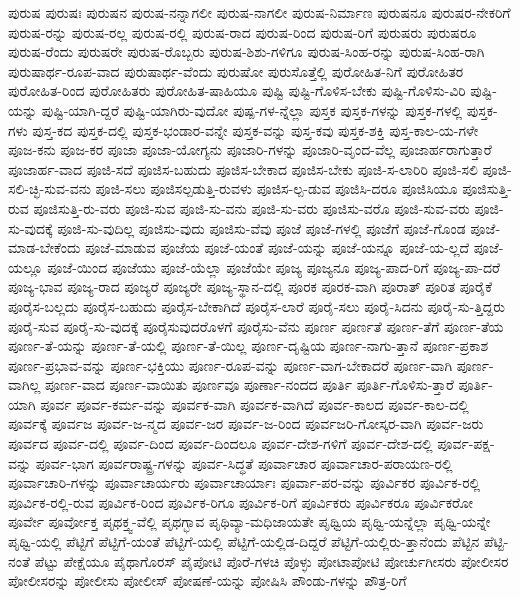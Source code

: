 {ಪುರುಷ
ಪುರುಷಃ
ಪುರುಷನ
ಪುರುಷ-ನನ್ನಾಗಲೀ
ಪುರುಷ-ನಾಗಲೀ
ಪುರುಷ-ನಿರ್ಮಾಣ
ಪುರುಷನೂ
ಪುರುಷರ-ನೇಕರಿಗೆ
ಪುರುಷ-ರನ್ನು
ಪುರುಷ-ರಲ್ಲ
ಪುರುಷ-ರಲ್ಲಿ
ಪುರುಷ-ರಾದ
ಪುರುಷ-ರಿಂದ
ಪುರುಷ-ರಿಗೆ
ಪುರುಷರು
ಪುರುಷರೂ
ಪುರುಷ-ರೆಂದು
ಪುರುಷರೇ
ಪುರುಷ-ರೊಬ್ಬರು
ಪುರುಷ-ಶಿಶು-ಗಳಿಗೂ
ಪುರುಷ-ಸಿಂಹ-ರನ್ನು
ಪುರುಷ-ಸಿಂಹ-ರಾಗಿ
ಪುರುಷಾರ್ಥ-ರೂಪ-ವಾದ
ಪುರುಷಾರ್ಥ-ವೆಂದು
ಪುರುಷೋ
ಪುರುಸೊತ್ತೆಲ್ಲಿ
ಪುರೋಹಿತ-ನಿಗೆ
ಪುರೋಹಿತರ
ಪುರೋಹಿತ-ರಿಂದ
ಪುರೋಹಿತರು
ಪುರೋಹಿತ-ಷಾಹಿಯೂ
ಪುಷ್ಟಿ
ಪುಷ್ಟಿ-ಗೊಳಿಸ-ಬೇಕು
ಪುಷ್ಟಿ-ಗೊಳಿಸು-ವಿರಿ
ಪುಷ್ಟಿ-ಯನ್ನು
ಪುಷ್ಟಿ-ಯಾಗಿ-ದ್ದರೆ
ಪುಷ್ಟಿ-ಯಾಗಿರು-ವುದೋ
ಪುಷ್ಪ-ಗಳ-ನ್ನೆಲ್ಲಾ
ಪುಸ್ತಕ
ಪುಸ್ತಕ-ಗಳನ್ನು
ಪುಸ್ತಕ-ಗಳಲ್ಲಿ
ಪುಸ್ತಕ-ಗಳು
ಪುಸ್ತ-ಕದ
ಪುಸ್ತಕ-ದಲ್ಲಿ
ಪುಸ್ತಕ-ಭಂಡಾರ-ವನ್ನೇ
ಪುಸ್ತಕ-ವನ್ನು
ಪುಸ್ತ-ಕವು
ಪುಸ್ತಕ-ಶಕ್ತಿ
ಪುಸ್ತ-ಕಾಲ-ಯ-ಗಳೇ
ಪೂಜ-ಕನು
ಪೂಜ-ಕರ
ಪೂಜಾ
ಪೂಜಾ-ಯೋಗ್ಯನು
ಪೂಜಾರಿ-ಗಳನ್ನು
ಪೂಜಾರಿ-ವೃಂದ-ವೆಲ್ಲ
ಪೂಜಾರ್ಹರಾಗುತ್ತಾರೆ
ಪೂಜಾರ್ಹ-ವಾದ
ಪೂಜಿ-ಸದೆ
ಪೂಜಿಸ-ಬಹುದು
ಪೂಜಿಸ-ಬೇಕಾದ
ಪೂಜಿಸ-ಬೇಕು
ಪೂಜಿ-ಸ-ಲಾರಿರಿ
ಪೂಜಿ-ಸಲಿ
ಪೂಜಿ-ಸಲಿ-ಚ್ಛಿ-ಸುವ-ವನು
ಪೂಜಿ-ಸಲು
ಪೂಜಿಸಲ್ಪಡುತ್ತಿ-ರುವಳು
ಪೂಜಿಸ-ಲ್ಪ-ಡುವ
ಪೂಜಿಸಿ-ದರೂ
ಪೂಜಿಸಿಯೂ
ಪೂಜಿಸುತ್ತಿ-ರುವ
ಪೂಜಿಸುತ್ತಿ-ರು-ವರು
ಪೂಜಿ-ಸುವ
ಪೂಜಿ-ಸು-ವನು
ಪೂಜಿ-ಸು-ವರು
ಪೂಜಿಸು-ವರೊ
ಪೂಜಿ-ಸುವ-ವರು
ಪೂಜಿ-ಸು-ವುದಕ್ಕೆ
ಪೂಜಿ-ಸು-ವುದಿಲ್ಲ
ಪೂಜಿಸು-ವುದು
ಪೂಜಿಸು-ವೆವು
ಪೂಜೆ
ಪೂಜೆ-ಗಳಲ್ಲಿ
ಪೂಜೆಗೆ
ಪೂಜೆ-ಗೊಂಡ
ಪೂಜೆ-ಮಾಡ-ಬೇಕೆಂದು
ಪೂಜೆ-ಮಾಡುವ
ಪೂಜೆಯ
ಪೂಜೆ-ಯಂತೆ
ಪೂಜೆ-ಯನ್ನು
ಪೂಜೆ-ಯನ್ನೂ
ಪೂಜೆ-ಯ-ಲ್ಲದೆ
ಪೂಜೆ-ಯಲ್ಲೂ
ಪೂಜೆ-ಯಿಂದ
ಪೂಜೆಯು
ಪೂಜೆ-ಯೆಲ್ಲಾ
ಪೂಜೆಯೇ
ಪೂಜ್ಯ
ಪೂಜ್ಯನೂ
ಪೂಜ್ಯ-ಪಾದ-ರಿಗೆ
ಪೂಜ್ಯ-ಪಾ-ದರೆ
ಪೂಜ್ಯ-ಭಾವ
ಪೂಜ್ಯ-ರಾದ
ಪೂಜ್ಯರೆ
ಪೂಜ್ಯರೇ
ಪೂಜ್ಯ-ಸ್ಥಾನ-ದಲ್ಲಿ
ಪೂರಕ
ಪೂರಕ-ವಾಗಿ
ಪೂರಾತ್
ಪೂರಿತ
ಪೂರೈಕೆ
ಪೂರೈಸ-ಬಲ್ಲದು
ಪೂರೈಸ-ಬಹುದು
ಪೂರೈಸ-ಬೇಕಾಗಿದೆ
ಪೂರೈಸ-ಲಾರೆ
ಪೂರೈ-ಸಲು
ಪೂರೈ-ಸಿದನು
ಪೂರೈ-ಸು-ತ್ತಿದ್ದರು
ಪೂರೈ-ಸುವ
ಪೂರೈ-ಸು-ವುದಕ್ಕೆ
ಪೂರೈಸುವುದರೊಳಗೆ
ಪೂರೈಸು-ವೆನು
ಪೂರ್ಣ
ಪೂರ್ಣತೆ
ಪೂರ್ಣ-ತೆಗೆ
ಪೂರ್ಣ-ತೆಯ
ಪೂರ್ಣ-ತೆ-ಯನ್ನು
ಪೂರ್ಣ-ತೆ-ಯಲ್ಲಿ
ಪೂರ್ಣ-ತೆ-ಯಿಲ್ಲ
ಪೂರ್ಣ-ದೃಷ್ಟಿಯ
ಪೂರ್ಣ-ನಾಗು-ತ್ತಾನೆ
ಪೂರ್ಣ-ಪ್ರಕಾಶ
ಪೂರ್ಣ-ಪ್ರಭಾವ-ವನ್ನು
ಪೂರ್ಣ-ಭಕ್ತಿಯು
ಪೂರ್ಣ-ರೂಪ-ವನ್ನು
ಪೂರ್ಣ-ವಾಗ-ಬೇಕಾದರೆ
ಪೂರ್ಣ-ವಾಗಿ
ಪೂರ್ಣ-ವಾಗಿಲ್ಲ
ಪೂರ್ಣ-ವಾದ
ಪೂರ್ಣ-ವಾಯಿತು
ಪೂರ್ಣವೂ
ಪೂರ್ಣಾ-ನಂದದ
ಪೂರ್ತಿ
ಪೂರ್ತಿ-ಗೊಳಿಸು-ತ್ತಾರೆ
ಪೂರ್ತಿ-ಯಾಗಿ
ಪೂರ್ವ
ಪೂರ್ವ-ಕರ್ಮ-ವನ್ನು
ಪೂರ್ವಕ-ವಾಗಿ
ಪೂರ್ವಕ-ವಾಗಿದೆ
ಪೂರ್ವ-ಕಾಲದ
ಪೂರ್ವ-ಕಾಲ-ದಲ್ಲಿ
ಪೂರ್ವಕ್ಕೆ
ಪೂರ್ವಜ
ಪೂರ್ವ-ಜ-ನ್ಮದ
ಪೂರ್ವ-ಜರ
ಪೂರ್ವ-ಜ-ರಿಂದ
ಪೂರ್ವಜರಿ-ಗೋಸ್ಕರ-ವಾಗಿ
ಪೂರ್ವ-ಜರು
ಪೂರ್ವದ
ಪೂರ್ವ-ದಲ್ಲಿ
ಪೂರ್ವ-ದಿಂದ
ಪೂರ್ವ-ದಿಂದಲೂ
ಪೂರ್ವ-ದೇಶ-ಗಳಿಗೆ
ಪೂರ್ವ-ದೇಶ-ದಲ್ಲಿ
ಪೂರ್ವ-ಪಕ್ಷ-ವನ್ನು
ಪೂರ್ವ-ಭಾಗ
ಪೂರ್ವರಾಷ್ಟ್ರ-ಗಳನ್ನು
ಪೂರ್ವ-ಸಿದ್ಧತೆ
ಪೂರ್ವಾಚಾರ
ಪೂರ್ವಾಚಾರ-ಪರಾಯಣ-ರಲ್ಲಿ
ಪೂರ್ವಾಚಾರಿ-ಗಳನ್ನು
ಪೂರ್ವಾಚಾರ್ಯರು
ಪೂರ್ವಾಚಾರ್ಯಾಃ
ಪೂರ್ವಾ-ಪರ-ವನ್ನು
ಪೂರ್ವಿಕರ
ಪೂರ್ವಿಕ-ರಲ್ಲಿ
ಪೂರ್ವಿಕ-ರಲ್ಲಿ-ರುವ
ಪೂರ್ವಿಕ-ರಿಂದ
ಪೂರ್ವಿಕ-ರಿಗೂ
ಪೂರ್ವಿಕ-ರಿಗೆ
ಪೂರ್ವಿಕರು
ಪೂರ್ವಿಕರೂ
ಪೂರ್ವಿಕರೋ
ಪೂರ್ವೇ
ಪೂರ್ವೋಕ್ತ
ಪೃಥಕ್ತ್ವ-ವೆಲ್ಲಿ
ಪೃಥಗ್ಭಾವ
ಪೃಥಿವ್ಯಾ-ಮಧಿಜಾಯತೇ
ಪೃಥ್ವಿಯ
ಪೃಥ್ವಿ-ಯನ್ನೆಲ್ಲಾ
ಪೃಥ್ವಿ-ಯನ್ನೇ
ಪೃಥ್ವಿ-ಯಲ್ಲಿ
ಪೆಟ್ಟಿಗೆ
ಪೆಟ್ಟಿಗೆ-ಯಂತೆ
ಪೆಟ್ಟಿಗೆ-ಯಲ್ಲಿ
ಪೆಟ್ಟಿಗೆ-ಯಲ್ಲಿಡ-ದಿದ್ದರೆ
ಪೆಟ್ಟಿಗೆ-ಯಲ್ಲಿರು-ತ್ತಾನೆಂದು
ಪೆಟ್ಟಿನ
ಪೆಟ್ಟಿ-ನಂತೆ
ಪೆಟ್ಟು
ಪೇಕ್ಷೆಯೂ
ಪೈಥಾಗೊರಸ್
ಪೈಪೋಟಿ
ಪೊರೆ-ಗಳಚಿ
ಪೊಳ್ಳು
ಪೋಟಾಪೋಟಿ
ಪೋರ್ಚುಗೀಸರು
ಪೋಲೀಸರ
ಪೋಲೀಸರನ್ನು
ಪೋಲೀಸು
ಪೋಲೀಸ್
ಪೋಷಣೆ-ಯನ್ನು
ಪೋಷಿಸಿ
ಪೌಂಡು-ಗಳನ್ನು
ಪೌತ್ರ-ರಿಗೆ
}
